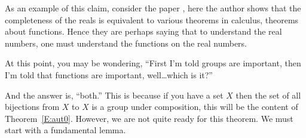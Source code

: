 \documentclass{ximera}
\begin{document}
As an example of this claim, consider the paper , here the
author shows that the completeness of the reals is equivalent to
various theorems in calculus, theorems about functions. Hence they are
perhaps saying that to understand the real numbers, one must
understand the functions on the real numbers.

At this point, you may be wondering, ``First I'm told groups are
important, then I'm told that functions are important, well\dots which
is it?''

And the answer is, ``both.'' This is because if you have a set $X$
then the set of all bijections from $X$ to $X$ is a group under
composition, this will be the content of
Theorem~\ref{E:aut0}. However, we are not quite ready for this
theorem. We must start with a fundamental lemma.
\end{document}
